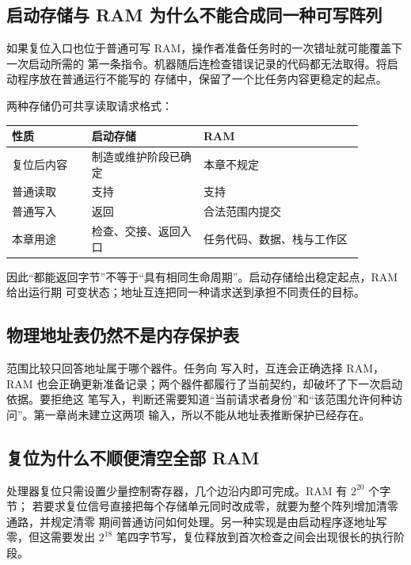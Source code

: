 \subsection{启动存储与 RAM 为什么不能合成同一种可写阵列}

如果复位入口也位于普通可写 RAM，操作者准备任务时的一次错址就可能覆盖下一次启动所需的
第一条指令。机器随后连检查错误记录的代码都无法取得。将启动程序放在普通运行不能写的
存储中，保留了一个比任务内容更稳定的起点。

两种存储仍可共享读取请求格式：

\begin{longtable}{|L{0.20\linewidth}|L{0.28\linewidth}|L{0.40\linewidth}|}
\hline
{}
性质 & 启动存储 & RAM \\ \hline
复位后内容 & 制造或维护阶段已确定 & 本章不规定 \\ \hline
普通读取 & 支持 & 支持 \\ \hline
普通写入 & 返回  & 合法范围内提交 \\ \hline
本章用途 & 检查、交接、返回入口 & 任务代码、数据、栈与工作区 \\ \hline
\end{longtable}

因此“都能返回字节”不等于“具有相同生命周期”。启动存储给出稳定起点，RAM 给出运行期
可变状态；地址互连把同一种请求送到承担不同责任的目标。

\subsection{物理地址表仍然不是内存保护表}

范围比较只回答地址属于哪个器件。任务向  写入时，互连会正确选择 RAM，
RAM 也会正确更新准备记录；两个器件都履行了当前契约，却破坏了下一次启动依据。要拒绝这
笔写入，判断还需要知道“当前请求者身份”和“该范围允许何种访问”。第一章尚未建立这两项
输入，所以不能从地址表推断保护已经存在。

\subsection{复位为什么不顺便清空全部 RAM}

处理器复位只需设置少量控制寄存器，几个边沿内即可完成。RAM 有 \(2^{20}\) 个字节；
若要求复位信号直接把每个存储单元同时改成零，就要为整个阵列增加清零通路，并规定清零
期间普通访问如何处理。另一种实现是由启动程序逐地址写零，但这需要发出
\(2^{18}\) 笔四字节写，复位释放到首次检查之间会出现很长的执行阶段。

